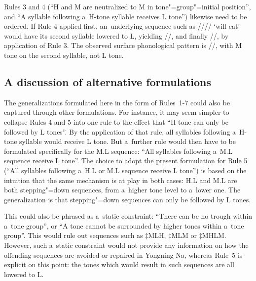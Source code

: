 
Rules 3 and 4 (“H and M are neutralized to M in tone"=group"=initial position”, and “A syllable following
a~H-tone syllable receives L tone”) likewise need to be ordered. If Rule 4 applied first,
an~underlying sequence such as //// ‘will eat’ would have its second syllable lowered
to L, yielding //, and finally //, by application of Rule 3. The
observed surface phonological pattern is //, with M tone on the second
syllable, not L tone.


\subsection{A discussion of alternative formulations}
\label{sec:adiscussionofalternativeformulations}

The generalizations formulated here in the form of Rules~1-7 could also be captured through other formulations. For instance, it may seem simpler to collapse Rules 4 and 5 into one rule to the
effect that “H tone can only be followed by L tones”. By the application of that rule, all syllables
following a~H-tone syllable would receive L tone. But a~further rule would then have to be formulated
specifically for the M.L sequence: “All syllables following a~M.L sequence receive L tone”. The choice
to adopt the present formulation for Rule 5 (“All syllables following a~H.L or M.L sequence receive L tone”) is based on the intuition that the same mechanism is at play in both cases: H.L and M.L are
both stepping"=down sequences, from a~higher tone level to a~lower one. The generalization is that
stepping"=down sequences can only be followed by L tones.

This could also be phrased as a~static constraint: “There can be no trough within a~tone group”, or
“A tone cannot be surrounded by higher tones within a~tone group”. This would rule out sequences
such as $\ddagger${\kern2pt}MLH, $\ddagger${\kern2pt}MLM or $\ddagger${\kern2pt}MHLM. However, such a~static constraint would not provide any information on
how the offending sequences are avoided or repaired in Yongning Na, whereas Rule~5 is explicit on this
point: the tones which would result in such sequences are all lowered to L.

